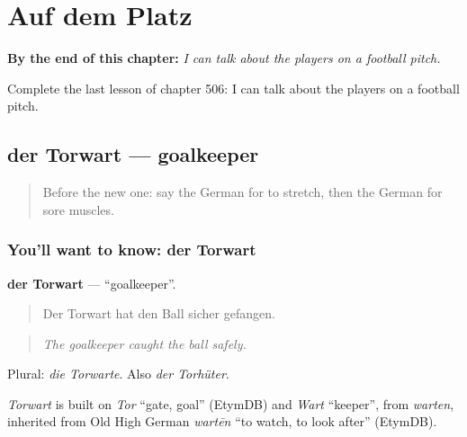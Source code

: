 
\chapter{Auf dem Platz}
\label{ch:ge-auf-dem-platz}

\begin{chapteropening}
\textbf{By the end of this chapter:} \emph{I can talk about the players on a football pitch.}

Complete the last lesson of chapter 506: I can talk about the players on a football pitch.
\end{chapteropening}

\section[der Torwart]{der Torwart — goalkeeper}

\label{lesson:GE-C506-torwart}



\begin{quote}
Before the new one: say the German for to stretch, then the German for sore muscles.
\end{quote}

\subsection*{You'll want to know: der Torwart}
\textbf{der Torwart} — \textquotedblleft{}goalkeeper\textquotedblright{}.

\begin{quote}
Der Torwart hat den Ball sicher gefangen.
\end{quote}

\begin{quote}
\emph{The goalkeeper caught the ball safely.}
\end{quote}

Plural: \emph{die Torwarte}. Also \emph{der Torhüter}.

\begin{cousinweb}
\emph{Torwart} is built on \emph{Tor} \textquotedblleft{}gate, goal\textquotedblright{} (EtymDB) and \emph{Wart} \textquotedblleft{}keeper\textquotedblright{}, from \emph{warten}, inherited from Old High German \emph{wartēn} \textquotedblleft{}to watch, to look after\textquotedblright{} (EtymDB).
\end{cousinweb}

